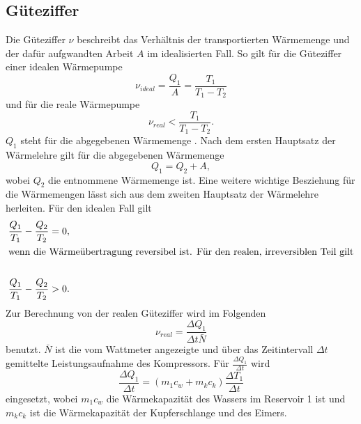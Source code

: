 \subsection{Güteziffer} %
\label{sub:Güteziffer}
Die Güteziffer $\nu$ beschreibt das Verhältnis der transportierten Wärmemenge und der dafür aufgwandten Arbeit $A$ im idealisierten Fall.
So gilt für die Güteziffer einer idealen Wärmepumpe
\begin{equation}
    \nu_{ideal} = \frac{Q_1}{A} = \frac{T_1}{T_1 - T_2}
    \label{eqn:Güteziffer_ideal}
\end{equation} 
und für die reale Wärmepumpe
\begin{equation*}
    \nu_{real} < \frac{T_1}{T_1 - T_2}.
\end{equation*}
$Q_1$ steht für die abgegebenen Wärmemenge . 
Nach dem ersten Hauptsatz der Wärmelehre gilt für die abgegebenen Wärmemenge
\begin{equation*}
    Q_1 = Q_2 + A ,
\end{equation*}
wobei $Q_2$  die entnommene Wärmemenge ist.
Eine weitere wichtige Besziehung für die Wärmemengen lässt sich aus dem zweiten Hauptsatz der Wärmelehre herleiten.
Für den idealen Fall gilt
\begin{align*}
    \frac{Q_1}{T_1}-\frac{Q_2}{T_2} = 0,\\
    \intertext{wenn die Wärmeübertragung reversibel ist. Für den realen, irreversiblen Teil gilt}\\
    \frac{Q_1}{T_1}-\frac{Q_2}{T_2} > 0.
\end{align*}
Zur Berechnung von der realen Güteziffer wird im Folgenden 
\begin{equation}
    \nu_{real} = \frac{\Delta Q_1}{\Delta t \bar{N}}
    \label{eqn:Güteziffer}
\end{equation}
benutzt. 
$\bar{N}$ ist die vom Wattmeter angezeigte und über das Zeitintervall $\Delta t$ gemittelte Leistungsaufnahme des Kompressors.
Für $\frac{\Delta Q_1}{\Delta t}$ wird
\begin{equation}
    \frac{\Delta Q_1}{\Delta t} = (m_1 c_w + m_k c_k)\frac{\Delta T_1}{\Delta t}
    \label{eqn:DeltaQ1}
\end{equation}
eingesetzt, wobei $m_1 c_w$ die Wärmekapazität des Wassers im Reservoir 1 ist und $m_k c_k$ ist die Wärmekapazität der Kupferschlange und des Eimers.
